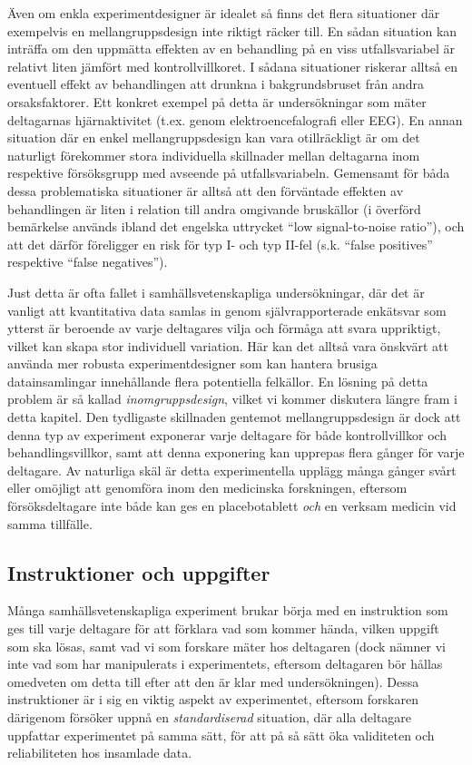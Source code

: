 \documentclass[
]{book}
\begin{document}
Även om enkla experimentdesigner är idealet så finns det flera situationer där exempelvis en mellangruppsdesign inte riktigt räcker till. En sådan situation kan inträffa om den uppmätta effekten av en behandling på en viss utfallsvariabel är relativt liten jämfört med kontrollvillkoret. I sådana situationer riskerar alltså en eventuell effekt av behandlingen att drunkna i bakgrundsbruset från andra orsaksfaktorer. Ett konkret exempel på detta är undersökningar som mäter deltagarnas hjärnaktivitet (t.ex. genom elektroencefalografi eller EEG). En annan situation där en enkel mellangruppsdesign kan vara otillräckligt är om det naturligt förekommer stora individuella skillnader mellan deltagarna inom respektive försöksgrupp med avseende på utfallsvariabeln. Gemensamt för båda dessa problematiska situationer är alltså att den förväntade effekten av behandlingen är liten i relation till andra omgivande bruskällor (i överförd bemärkelse används ibland det engelska uttrycket ``low signal-to-noise ratio''), och att det därför föreligger en risk för typ I- och typ II-fel (s.k. ``false positives'' respektive ``false negatives'').

Just detta är ofta fallet i samhällsvetenskapliga undersökningar, där det är vanligt att kvantitativa data samlas in genom självrapporterade enkätsvar som ytterst är beroende av varje deltagares vilja och förmåga att svara uppriktigt, vilket kan skapa stor individuell variation. Här kan det alltså vara önskvärt att använda mer robusta experimentdesigner som kan hantera brusiga datainsamlingar innehållande flera potentiella felkällor. En lösning på detta problem är så kallad \emph{inomgruppsdesign}, vilket vi kommer diskutera längre fram i detta kapitel. Den tydligaste skillnaden gentemot mellangruppsdesign är dock att denna typ av experiment exponerar varje deltagare för både kontrollvillkor och behandlingsvillkor, samt att denna exponering kan upprepas flera gånger för varje deltagare. Av naturliga skäl är detta experimentella upplägg många gånger svårt eller omöjligt att genomföra inom den medicinska forskningen, eftersom försöksdeltagare inte både kan ges en placebotablett \emph{och} en verksam medicin vid samma tillfälle.

\hypertarget{sub07.5.1}{%
\subsection{Instruktioner och uppgifter}\label{sub07.5.1}}

Många samhällsvetenskapliga experiment brukar börja med en instruktion som ges till varje deltagare för att förklara vad som kommer hända, vilken uppgift som ska lösas, samt vad vi som forskare mäter hos deltagaren (dock nämner vi inte vad som har manipulerats i experimentets, eftersom deltagaren bör hållas omedveten om detta till efter att den är klar med undersökningen). Dessa instruktioner är i sig en viktig aspekt av experimentet, eftersom forskaren därigenom försöker uppnå en \emph{standardiserad} situation, där alla deltagare uppfattar experimentet på samma sätt, för att på så sätt öka validiteten och reliabiliteten hos insamlade data.
\end{document}
